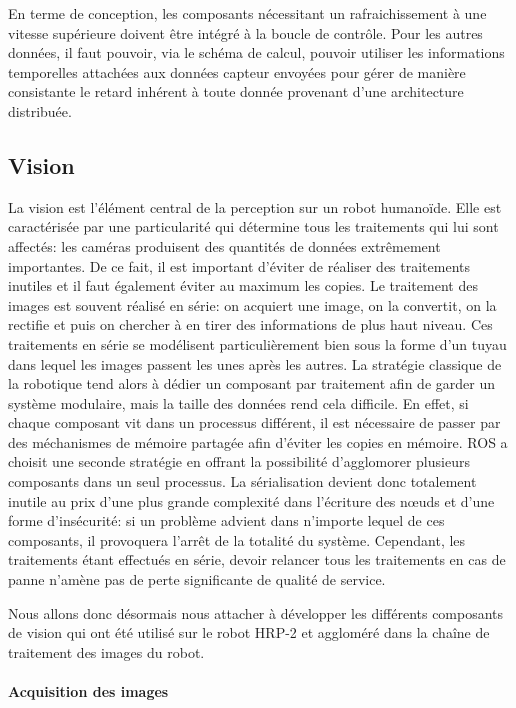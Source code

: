 En terme de conception, les composants nécessitant un rafraichissement
à une vitesse supérieure doivent être intégré à la boucle de
contrôle. Pour les autres données, il faut pouvoir, via le schéma de
calcul, pouvoir utiliser les informations temporelles attachées aux
données capteur envoyées pour gérer de manière consistante le retard
inhérent à toute donnée provenant d'une architecture distribuée.


\subsection{Vision}


La vision est l'élément central de la perception sur un robot
humanoïde. Elle est caractérisée par une particularité qui détermine
tous les traitements qui lui sont affectés: les caméras produisent des
quantités de données extrêmement importantes. De ce fait, il est
important d'éviter de réaliser des traitements inutiles et il faut
également éviter au maximum les copies. Le traitement des images est
souvent réalisé en série: on acquiert une image, on la convertit, on
la rectifie et puis on chercher à en tirer des informations de plus
haut niveau. Ces traitements en série se modélisent particulièrement
bien sous la forme d'un tuyau dans lequel les images passent les unes
après les autres. La stratégie classique de la robotique tend alors à
dédier un composant par traitement afin de garder un système
modulaire, mais la taille des données rend cela difficile. En effet,
si chaque composant vit dans un processus différent, il est nécessaire
de passer par des méchanismes de mémoire partagée afin d'éviter les
copies en mémoire. ROS a choisit une seconde stratégie en offrant la
possibilité d'agglomorer plusieurs composants dans un seul
processus. La sérialisation devient donc totalement inutile au prix
d'une plus grande complexité dans l'écriture des n\oe uds et d'une
forme d'insécurité: si un problème advient dans n'importe lequel de
ces composants, il provoquera l'arrêt de la totalité du
système. Cependant, les traitements étant effectués en série, devoir
relancer tous les traitements en cas de panne n'amène pas de perte
significante de qualité de service.


Nous allons donc désormais nous attacher à développer les différents
composants de vision qui ont été utilisé sur le robot HRP-2 et
aggloméré dans la chaîne de traitement des images du robot.


\paragraph{Acquisition des images}

